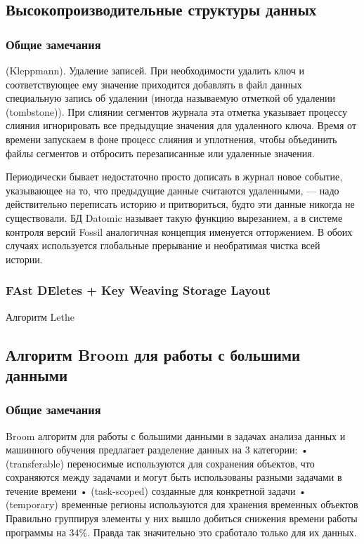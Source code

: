 \subsection{Высокопроизводительные структуры данных}

\subsubsection{Общие замечания}

(Kleppmann\cite{Kleppman:2017}). Удаление записей. При необходимости удалить ключ и соответствующее ему значение
приходится добавлять в файл данных специальную запись об удалении
(иногда называемую отметкой об удалении (tombstone)). При слиянии сегментов журнала эта отметка
указывает процессу слияния игнорировать все предыдущие значения для удаленного ключа.
Время от времени запускаем в фоне процесс слияния и уплотнения, чтобы объединить файлы сегментов
и отбросить перезаписанные или удаленные значения.

Периодически бывает недостаточно просто дописать в журнал новое событие, указывающее на то,
что предыдущие данные считаются удаленными, — надо действительно переписать историю и притвориться,
будто эти данные никогда не существовали. БД Datomic называет такую функцию вырезанием,
а в системе контроля версий Fossil аналогичная концепция именуется отторжением.
В обоих случаях используется глобальные прерывание и необратимая чистка всей истории.

\subsubsection{FAst DEletes + Key Weaving Storage Layout}

Алгоритм Lethe \cite{Lethe:2020}

\subsection{Алгоритм Broom для работы с большими данными}

\subsubsection{Общие замечания}

Broom алгоритм для работы с большими данными в задачах анализа данных и машинного обучения
предлагает разделение данных на 3 категории: 
    • (transferable) переносимые используются для сохранения объектов, что сохраняются
    между задачами и могут быть использованы разными задачами в течение времени
    • (task-scoped) созданные для конкретной задачи
    • (temporary) временные регионы используются для хранения временных объектов
Правильно группируя элементы у них вышло добиться снижения времени работы программы на 34\%.
Правда так значительно это сработало только для их данных.

